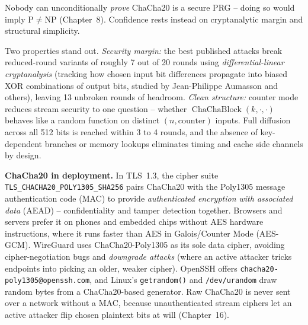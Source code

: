 Nobody can unconditionally \emph{prove} ChaCha20 is a secure PRG -- doing so would imply $\mathrm{P} \ne \mathrm{NP}$ (Chapter~8). Confidence rests instead on cryptanalytic margin and structural simplicity.

\begin{whybox}
Two properties stand out. \emph{Security margin:} the best published attacks break reduced-round variants of roughly 7 out of 20 rounds using \emph{differential-linear cryptanalysis} (tracking how chosen input bit differences propagate into biased XOR combinations of output bits, studied by Jean-Philippe Aumasson and others), leaving 13 unbroken rounds of headroom. \emph{Clean structure:} counter mode reduces stream security to one question -- whether $\operatorname{ChaChaBlock}(k, \cdot, \cdot)$ behaves like a random function on distinct $(n, \text{counter})$ inputs. Full diffusion across all 512 bits is reached within 3 to 4 rounds, and the absence of key-dependent branches or memory lookups eliminates timing and cache side channels by design.
\end{whybox}

\begin{applicationbox}
\label{ch10:app-chacha}
\textbf{ChaCha20 in deployment.} In TLS~1.3, the cipher suite \texttt{TLS\_CHACHA20\_POLY1305\_SHA256} pairs ChaCha20 with the Poly1305 message authentication code (MAC) to provide \emph{authenticated encryption with associated data} (AEAD) -- confidentiality and tamper detection together. Browsers and servers prefer it on phones and embedded chips without AES hardware instructions, where it runs faster than AES in Galois/Counter Mode (AES-GCM). WireGuard uses ChaCha20-Poly1305 as its sole data cipher, avoiding cipher-negotiation bugs and \emph{downgrade attacks} (where an active attacker tricks endpoints into picking an older, weaker cipher). OpenSSH offers \texttt{chacha20-poly1305@openssh.com}, and Linux's \texttt{getrandom()} and \texttt{/dev/urandom} draw random bytes from a ChaCha20-based generator. Raw ChaCha20 is never sent over a network without a MAC, because unauthenticated stream ciphers let an active attacker flip chosen plaintext bits at will (Chapter~16).
\end{applicationbox}

